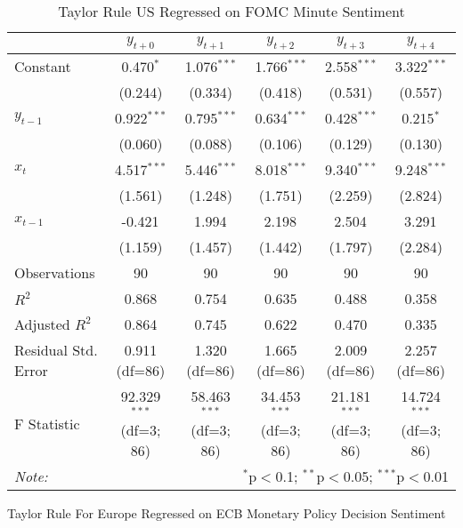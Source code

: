 \documentclass[12pt, letterpaper]{article}
\begin{document}
\begin{table}[H] \centering
  \caption{Taylor Rule US Regressed on FOMC Minute Sentiment}
  \begin{adjustbox}{width=\textwidth}
\begin{tabular}{lccccc}
\hline
\hline
 & $y_{t+0}$ & $y_{t+1}$ & $y_{t+2}$ & $y_{t+3}$ & $y_{t+4}$  \\
\hline
 Constant & 0.470$^{*}$ & 1.076$^{***}$ & 1.766$^{***}$ & 2.558$^{***}$ & 3.322$^{***}$ \\
& (0.244) & (0.334) & (0.418) & (0.531) & (0.557) \\
 $y_{t-1}$ & 0.922$^{***}$ & 0.795$^{***}$ & 0.634$^{***}$ & 0.428$^{***}$ & 0.215$^{*}$ \\
& (0.060) & (0.088) & (0.106) & (0.129) & (0.130) \\
 $x_{t}$ & 4.517$^{***}$ & 5.446$^{***}$ & 8.018$^{***}$ & 9.340$^{***}$ & 9.248$^{***}$ \\
& (1.561) & (1.248) & (1.751) & (2.259) & (2.824) \\
 $x_{t-1}$ & -0.421$^{}$ & 1.994$^{}$ & 2.198$^{}$ & 2.504$^{}$ & 3.291$^{}$ \\
& (1.159) & (1.457) & (1.442) & (1.797) & (2.284) \\
\hline
 Observations & 90 & 90 & 90 & 90 & 90 \\
 $R^2$ & 0.868 & 0.754 & 0.635 & 0.488 & 0.358 \\
 Adjusted $R^2$ & 0.864 & 0.745 & 0.622 & 0.470 & 0.335 \\
 Residual Std. Error & 0.911 (df=86) & 1.320 (df=86) & 1.665 (df=86) & 2.009 (df=86) & 2.257 (df=86) \\
 F Statistic & 92.329$^{***}$ (df=3; 86) & 58.463$^{***}$ (df=3; 86) & 34.453$^{***}$ (df=3; 86) & 21.181$^{***}$ (df=3; 86) & 14.724$^{***}$ (df=3; 86) \\
\hline
\hline
\textit{Note:} & \multicolumn{5}{r}{$^{*}$p$<$0.1; $^{**}$p$<$0.05; $^{***}$p$<$0.01} \\
\end{tabular}
\end{adjustbox}
\end{table}


Taylor Rule For Europe Regressed on ECB Monetary Policy Decision Sentiment
\end{document}
